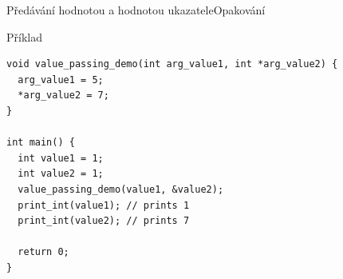 \begin{frame}[fragile]{Předávání hodnotou a hodnotou ukazatele}{Opakování}

\begin{block}{Příklad}
\begin{lstlisting}
void value_passing_demo(int arg_value1, int *arg_value2) {
  arg_value1 = 5;
  *arg_value2 = 7;
}

int main() {
  int value1 = 1;
  int value2 = 1;
  value_passing_demo(value1, &value2);
  print_int(value1); // prints 1
  print_int(value2); // prints 7

  return 0;
}
\end{lstlisting}
\end{block}

\end{frame}

